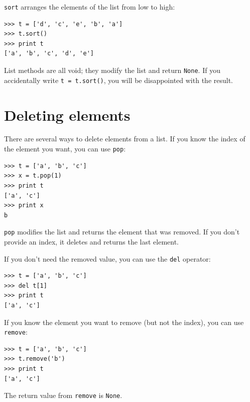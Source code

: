 \documentclass[10pt]{book}
\begin{document}
{\tt sort} arranges the elements of the list from low to high:


\beforeverb
\begin{verbatim}
>>> t = ['d', 'c', 'e', 'b', 'a']
>>> t.sort()
>>> print t
['a', 'b', 'c', 'd', 'e']
\end{verbatim}
\afterverb
%
List methods are all void; they modify the list and return {\tt None}.
If you accidentally write {\tt t = t.sort()}, you will be disappointed
with the result.


\section{Deleting elements}


There are several ways to delete elements from a list.  If you
know the index of the element you want, you can use
{\tt pop}:


\beforeverb
\begin{verbatim}
>>> t = ['a', 'b', 'c']
>>> x = t.pop(1)
>>> print t
['a', 'c']
>>> print x
b
\end{verbatim}
\afterverb
%
{\tt pop} modifies the list and returns the element that was removed.
If you don't provide an index, it deletes and returns the
last element.

If you don't need the removed value, you can use the {\tt del}
operator:


\beforeverb
\begin{verbatim}
>>> t = ['a', 'b', 'c']
>>> del t[1]
>>> print t
['a', 'c']
\end{verbatim}
\afterverb
%

If you know the element you want to remove (but not the index), you
can use {\tt remove}:


\beforeverb
\begin{verbatim}
>>> t = ['a', 'b', 'c']
>>> t.remove('b')
>>> print t
['a', 'c']
\end{verbatim}
\afterverb
%
The return value from {\tt remove} is {\tt None}.
\end{document}
